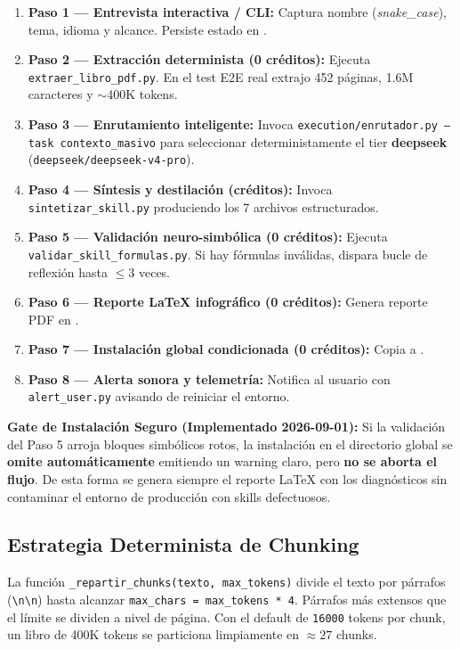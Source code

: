 \documentclass[11pt,a4paper]{article}
\begin{document}
\begin{enumerate}[leftmargin=*]
  \item \textbf{Paso 1 --- Entrevista interactiva / CLI:} Captura nombre (\textit{snake\_case}), tema, idioma y alcance. Persiste estado en .
  \item \textbf{Paso 2 --- Extracción determinista (0 créditos):} Ejecuta \texttt{extraer\_libro\_pdf.py}. En el test E2E real extrajo 452 páginas, 1.6M caracteres y $\sim$400K tokens.
  \item \textbf{Paso 3 --- Enrutamiento inteligente:} Invoca \texttt{execution/enrutador.py --task contexto\_masivo} para seleccionar deterministamente el tier \textbf{deepseek} (\texttt{deepseek/deepseek-v4-pro}).
  \item \textbf{Paso 4 --- Síntesis y destilación (créditos):} Invoca \texttt{sintetizar\_skill.py} produciendo los 7 archivos estructurados.
  \item \textbf{Paso 5 --- Validación neuro-simbólica (0 créditos):} Ejecuta \texttt{validar\_skill\_formulas.py}. Si hay fórmulas inválidas, dispara bucle de reflexión hasta $\le 3$ veces.
  \item \textbf{Paso 6 --- Reporte LaTeX infográfico (0 créditos):} Genera reporte PDF en .
  \item \textbf{Paso 7 --- Instalación global condicionada (0 créditos):} Copia a .
  \item \textbf{Paso 8 --- Alerta sonora y telemetría:} Notifica al usuario con \texttt{alert\_user.py} avisando de reiniciar el entorno.
\end{enumerate}

\begin{cajaAlerta}
\textbf{Gate de Instalación Seguro (Implementado 2026-09-01):} Si la validación del Paso 5 arroja bloques simbólicos rotos, la instalación en el directorio global se \textbf{omite automáticamente} emitiendo un warning claro, pero \textbf{no se aborta el flujo}. De esta forma se genera siempre el reporte LaTeX con los diagnósticos sin contaminar el entorno de producción con skills defectuosos.
\end{cajaAlerta}

\subsection{Estrategia Determinista de Chunking}
La función \texttt{\_repartir\_chunks(texto, max\_tokens)} divide el texto por párrafos (\texttt{\textbackslash n\textbackslash n}) hasta alcanzar \texttt{max\_chars = max\_tokens * 4}. Párrafos más extensos que el límite se dividen a nivel de página. Con el default de \texttt{16000} tokens por chunk, un libro de 400K tokens se particiona limpiamente en $\approx 27$ chunks.
\end{document}
